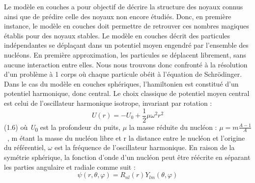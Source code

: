 Le modèle en couches a pour objectif de décrire la structure des noyaux connus ainsi que de prédire celle des noyaux non
encore étudiés. Donc, en première instance, le modèle en couches doit permettre de retrouver ces nombres magiques
établis pour des\textbf{ }noyaux stables. Le modèle en couches décrit des particules indépendantes se déplaçant dans un
potentiel moyen engendré par l'ensemble des nucléons. En première approximation, les particules se déplacent librement,
sans aucune interaction entre elles. Nous nous trouvons donc confronté à la résolution d'un problème à 1 corps où
chaque particule obéit à l'équation de Schrödinger. Dans le cas du modèle en couches sphériques, l'hamiltonien est
constitué d'un potentiel harmonique, donc central. Le choix classique de potentiel moyen central est celui de
l'oscillateur harmonique isotrope, invariant par rotation : ${}$
 \begin{equation}U\left(r\right)=-U_0+\frac 1 2\mu \omega
^2r^2\end{equation} (1.6)
où \textit{U}\textsubscript{0} est la profondeur du puits, $\mu $ la masse réduite du nucléon : $\mu =m\frac{A-1} A$\ ,
m étant la masse du nucléon libre et r la distance entre le nucléon et l'origine du référentiel, $\omega $ est la
fréquence de l'oscillateur harmonique. En raison de la symétrie sphérique, la fonction d'onde d'un nucléon peut être
réécrite en séparant les parties angulaire et radiale comme suit :
\begin{equation}\psi \left(r,\theta ,\varphi
\right)=R_{\mathit{nl}}(r)Y_{\mathit{lm}}(\theta ,\varphi
)
\end{equation}

